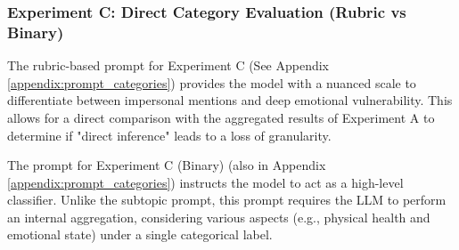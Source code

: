         \subsubsection{Experiment C: Direct Category Evaluation (Rubric vs Binary)}

The rubric-based prompt  for Experiment C (See Appendix \ref{appendix:prompt_categories}) provides the model with a nuanced scale to differentiate between impersonal mentions and deep emotional vulnerability. This allows for a direct comparison with the aggregated results of Experiment A to determine if "direct inference" leads to a loss of granularity. 
        
The prompt for Experiment C (Binary) (also in Appendix \ref{appendix:prompt_categories}) instructs the model to act as a high-level classifier. Unlike the subtopic prompt, this prompt requires the LLM to perform an internal aggregation, considering various aspects (e.g., physical health and emotional state) under a single categorical label.




    
    


